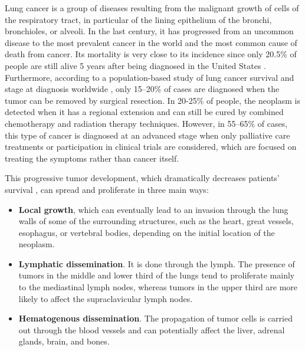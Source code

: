 Lung cancer is a group of diseases resulting from the malignant growth of cells of the respiratory tract, in particular of the lining epithelium of the bronchi, bronchioles, or alveoli. In the last century, it has progressed from an uncommon disease to the most prevalent cancer in the world and the most common cause of death from cancer. Its mortality is very close to its incidence since only 20.5\% of people are still alive 5 years after being diagnosed in the United States \cite{SEER}. Furthermore, according to a population-based study of lung cancer survival and stage at diagnosis worldwide \cite{Walters}, only 15–20\% of cases are diagnosed when the tumor can be removed by surgical resection. In 20-25\% of people, the neoplasm is detected when it has a regional extension and can still be cured by combined chemotherapy and radiation therapy techniques. However, in 55–65\% of cases, this type of cancer is diagnosed at an advanced stage when only palliative care treatments or participation in clinical trials are considered, which are focused on treating the symptoms rather than cancer itself.

This progressive tumor development, which dramatically decreases patients' survival \cite{SEER}, can spread and proliferate in three main ways:
\begin{itemize}
    \item \textbf{Local growth}, which can eventually lead to an invasion through the lung walls of some of the surrounding structures, such as the heart, great vessels, esophagus, or vertebral bodies, depending on the initial location of the neoplasm.
    \item \textbf{Lymphatic dissemination}. It is done through the lymph. The presence of tumors in the middle and lower third of the lungs tend to proliferate mainly to the mediastinal lymph nodes, whereas tumors in the upper third are more likely to affect the supraclavicular lymph nodes.
    \item \textbf{Hematogenous dissemination}. The propagation of tumor cells is carried out through the blood vessels and can potentially affect the liver, adrenal glands, brain, and bones.
\end{itemize}


